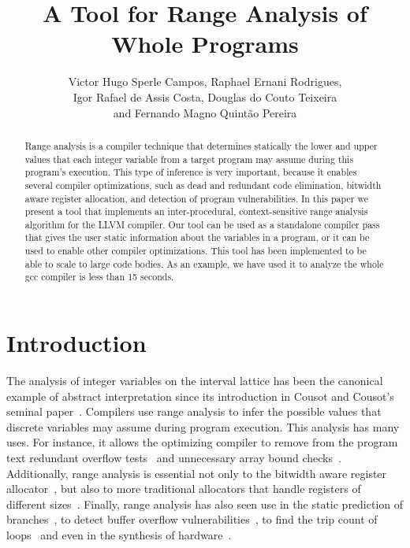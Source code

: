 \documentclass{paper}
\begin{document}
\lstset{language=, basicstyle=\small} 

\title{A Tool for Range Analysis of Whole Programs}

\author{Victor Hugo Sperle Campos, Raphael Ernani Rodrigues, \\
Igor Rafael de Assis Costa, Douglas do Couto Teixeira \\
and Fernando Magno Quint\~{a}o Pereira}

\address{UFMG -- 6627 Ant\^{o}nio Carlos Av, 31.270-010, Belo Horizonte, Brazil
}


\maketitle

\begin{abstract}
Range analysis is a compiler technique that determines statically the lower and
upper values that each integer variable from a target program may assume
during this program's execution.
This type of inference is very important, because it enables several compiler
optimizations, such as dead and redundant code elimination, bitwidth aware
register allocation, and detection of program vulnerabilities.
In this paper we present a tool that implements an inter-procedural,
context-sensitive  range analysis algorithm for the LLVM compiler.
Our tool can be used as a standalone compiler pass that gives the user
static information about the variables in a program, or it can be used to
enable other compiler optimizations.
This tool has been implemented to be able to scale to large code bodies.
As an example, we have used it to analyze the whole gcc compiler is less than
15 seconds.
\end{abstract}

\section{Introduction}
\label{sec:intro}

The analysis of integer variables on the interval lattice has been the
canonical example of abstract interpretation since its introduction in
Cousot and Cousot's seminal paper~\cite{Cousot77}.
Compilers use range analysis to infer the possible values that discrete
variables may assume during program execution.
This analysis has many uses.
For instance, it allows the optimizing compiler to remove from the program text
redundant overflow tests~\cite{Sol11} and unnecessary array bound
checks~\cite{Bodik00}.
Additionally, range analysis is essential not only to the bitwidth aware
register allocator~\cite{Barik06}, but also to more traditional
allocators that handle registers of different
sizes~\cite{Pereira08}.
Finally, range analysis has also seen use in the static prediction of
branches~\cite{Patterson95}, to detect buffer overflow
vulnerabilities~\cite{Simon08}, to find the trip count of
loops~\cite{Lokuciejewski09}
and even in the synthesis of hardware~\cite{Mahlke01}.
\end{document}
